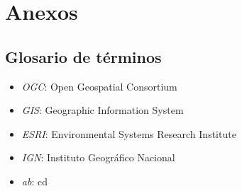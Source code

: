 \chapter{Anexos}
\section{Glosario de términos}
\begin{itemize}
    \item \textit{OGC}: Open Geospatial Consortium
    \item \textit{GIS}: Geographic Information System
    \item \textit{ESRI}: Environmental Systems Research Institute
    \item \textit{IGN}: Instituto Geográfico Nacional
    \item \textit{ab}: cd
\end{itemize}





 
